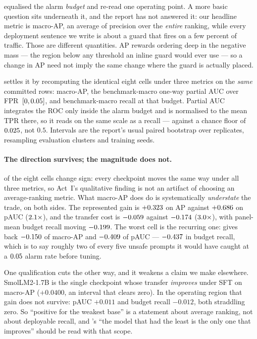  equalised the alarm \emph{budget} and re-read one operating point. A more basic
question sits underneath it, and the report has not answered it: our headline metric is macro-AP,
an average of precision over the \emph{entire} ranking, while every deployment sentence we write is
about a guard that fires on a few percent of traffic. Those are different quantities. AP rewards
ordering deep in the negative mass --- the region below any threshold an inline guard would ever
use --- so a change in AP need not imply the same change where the guard is actually placed.

 settles it by recomputing the identical eight cells under three metrics on the
\emph{same} committed rows: macro-AP, the benchmark-macro one-way partial AUC over
FPR~$[0,0.05]$, and benchmark-macro recall at that budget. Partial AUC integrates the ROC
only inside the alarm budget and is normalised to the mean TPR there, so it reads on the same scale
as a recall --- against a chance floor of $0.025$, not $0.5$. Intervals are the report's
usual paired bootstrap over \LowFprNBoot{} replicates, resampling evaluation 
clusters and training seeds.



\paragraph{The direction survives; the magnitude does not.} \LowFprSignFlips{} of the eight cells
change sign: every checkpoint moves the same way under all three metrics, so Act~I's qualitative
finding is not an artifact of choosing an average-ranking metric. What macro-AP does do is
systematically \emph{understate} the trade, on both sides. The represented gain is
$+0.323$ on AP against $+0.686$ on pAUC
($2.1\times$), and the transfer cost is $-0.059$ against
$-0.174$ ($3.0\times$), with panel-mean budget recall moving
$-0.199$. The worst cell is the recurring one: \LowFprWorstName{} gives back
$-0.150$ of macro-AP and $-0.409$ \LowFprWorstPAucCI{} of pAUC ---
$-0.437$ in budget recall, which is to say roughly two of every five unsafe prompts it
would have caught at a $0.05$ alarm rate before tuning.

One qualification cuts the other way, and it weakens a claim we make elsewhere. SmolLM2-1.7B is the
single checkpoint whose transfer \emph{improves} under SFT on macro-AP ($+0.0400$, an interval that
clears zero). In the operating region that gain does not survive: pAUC $+0.011$ and budget recall
$-0.012$, both straddling zero. So ``positive for the weakest base'' is a statement about average
ranking, not about deployable recall, and 's ``the model that had the least
is the only one that improves'' should be read with that scope.

